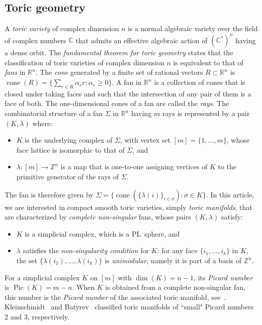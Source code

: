 \documentclass[11pt]{amsart}
\theoremstyle{plain}
\numberwithin{equation}{section}
\theoremstyle{definition}
\newcommand{\C}{\mathbb{C}}
\newcommand{\R}{\mathbb{R}}
\newcommand{\Z}{\mathbb{Z}}
\DeclareMathOperator{\Pic}{Pic}
\DeclareMathOperator{\cone}{cone}
\begin{document}
\subsection*{Toric geometry}
A \emph{toric variety} of complex dimension $n$ is a normal algebraic variety over the field of complex numbers $\C$ that admits an effective algebraic action of $(\C^\ast)^n$ having a dense orbit.
The \emph{fundamental theorem for toric geometry} states that the classification of toric varieties of complex dimension $n$ is equivalent to that of \emph{fans} in $\R^n$.
The \emph{cone} generated by a finite set of rational vectors $R \subset \R^n$ is $\cone(R) = \{\sum_{r\in R} \alpha_r r\colon \alpha_r\geq 0\}$.
A fan in $\R^n$ is a collection of cones that is closed under taking faces and such that the intersection of any pair of them is a face of both.
The one-dimensional cones of a fan are called the \emph{rays}.
The combinatorial structure of a fan $\Sigma$ in $\R^n$ having $m$ rays is represented by a pair $(K,\lambda)$ where:
\begin{itemize}
	\item $K$ is the underlying complex of $\Sigma$, with vertex set $[m]=\{1,\dots,m\}$, whose face lattice is isomorphic to that of $\Sigma$, and
	\item $\lambda \colon [m]\to\Z^n$ is a map that is one-to-one assigning vertices of $K$ to the primitive generator of the rays of $\Sigma$.
\end{itemize}
The fan is therefore given by $\Sigma = \{\cone \left( \{\lambda(i)\}_{i\in \sigma}\right)\colon \sigma\in K\}$.
In this article, we are interested in compact smooth toric varieties, simply \emph{toric manifolds}, that are characterized by \emph{complete non-singular} fans, whose pairs $(K,\lambda)$ satisfy:
\begin{itemize}
	\item $K$ is a simplicial complex, which is a PL~sphere, and
	\item $\lambda$ satisfies the \emph{non-singularity condition} for $K$: for any face $\{i_1, \ldots, i_k\}$ in $K$, the set $\{\lambda(i_1), \ldots, \lambda(i_k)\}$ is \emph{unimodular}, namely it is part of a basis of $\Z^n$.
\end{itemize}
For a simplicial complex $K$ on $[m]$ with $\dim(K)=n-1$, its \emph{Picard number} is $\Pic(K)=m-n$.
When $K$ is obtained from a complete non-singular fan, this number is the \emph{Picard number} of the associated toric manifold, see~\cite[Section~3.4]{Fulton1997book}.
Kleinschmidt~\cite{Kleinschmidt1988} and Batyrev~\cite{Batyrev1991} classified toric manifolds of ``small" Picard numbers~$2$ and $3$, respectively.
\end{document}
